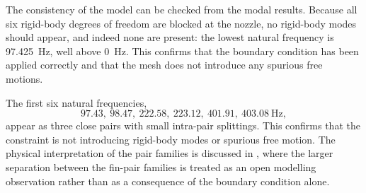 The consistency of the model can be checked from the modal results. Because all six rigid-body degrees of freedom are blocked at the nozzle, no rigid-body modes should appear, and indeed none are present: the lowest natural frequency is \SI{97.425}{\hertz}, well above \SI{0}{\hertz}. This confirms that the boundary condition has been applied correctly and that the mesh does not introduce any spurious free motions.

The first six natural frequencies,
\begin{equation*}
    97.43,\ 98.47,\ 222.58,\ 223.12,\ 401.91,\ 403.08\ \si{\hertz},
\end{equation*}
appear as three close pairs with small intra-pair splittings. This confirms that the constraint is not introducing rigid-body modes or spurious free motion. The physical interpretation of the pair families is discussed in , where the larger separation between the fin-pair families is treated as an open modelling observation rather than as a consequence of the boundary condition alone.
